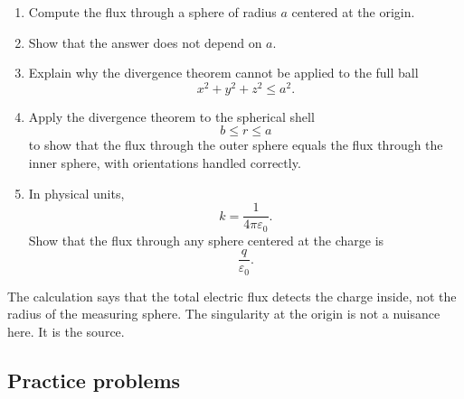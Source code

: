 \begin{enumerate}
\item Compute the flux through a sphere of radius \(a\) centered at the origin.

\item Show that the answer does not depend on \(a\).

\item Explain why the divergence theorem cannot be applied to the full ball
\[
    x^2+y^2+z^2\le a^2.
\]

\item Apply the divergence theorem to the spherical shell
\[
    b\le r\le a
\]
to show that the flux through the outer sphere equals the flux through the inner sphere,
with orientations handled correctly.

\item In physical units,
\[
    k=\frac{1}{4\pi\varepsilon_0}.
\]
Show that the flux through any sphere centered at the charge is
\[
    \frac{q}{\varepsilon_0}.
\]
\end{enumerate}

The calculation says that the total electric flux detects the charge inside, not the radius
of the measuring sphere.  The singularity at the origin is not a nuisance here.  It is the
source.

\subsection{Practice problems}

